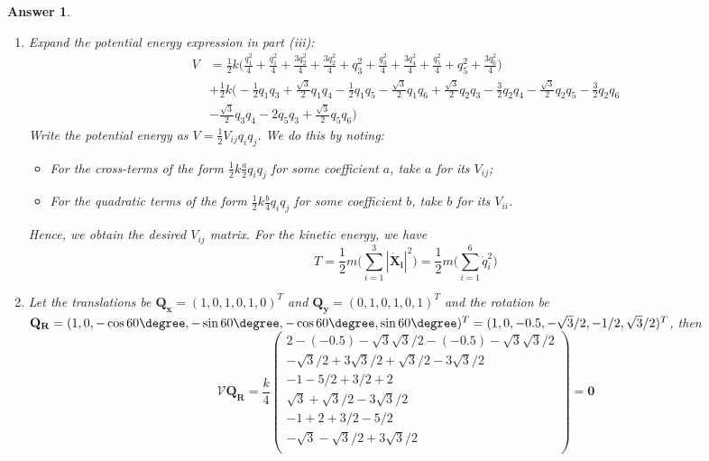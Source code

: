 \documentclass[a4paper]{article}
\newtheorem{ans}{Answer}[section]
\theoremstyle{new}
\begin{document}
\begin{ans}
\begin{enumerate}[label=(\roman*)]
$$\mathbf{x_1}-\mathbf{x_3}=\begin{pmatrix}q_1-q_5\\q_2-q_6\\\end{pmatrix}+\begin{pmatrix}\sqrt{3}/2\\3/2\\\end{pmatrix}\implies V_{1,3}=\frac{1}{2}k\bigg[\frac{(\sqrt{3}/2)(q_1-q_5)+(3/2)(q_2-q_6)}{\sqrt{3}}\bigg]^2$$
The potential energy, expanded to quadratic order, will be a sum of these 3 terms.
\item Expand the potential energy expression in part (iii):
\begin{align}
    V&=\frac{1}{2}k\bigg(\frac{q_1^2}{4}+\frac{q_1^2}{4}+\frac{3q_2^2}{4}+\frac{3q_2^2}{4}+q_3^2+\frac{q_3^2}{4}+\frac{3q_4^2}{4}+\frac{q_5^2}{4}+q_5^2+\frac{3q_6^2}{4}\bigg)\nonumber\\&+\frac{1}{2}k\bigg(-\frac{1}{2}q_1q_3+\frac{\sqrt{3}}{2}q_1q_4-\frac{1}{2}q_1q_5-\frac{\sqrt{3}}{2}q_1q_6+\frac{\sqrt{3}}{2}q_2q_3-\frac{3}{2}q_2q_4-\frac{\sqrt{3}}{2}q_2q_5-\frac{3}{2}q_2q_6\nonumber\\&-\frac{\sqrt{3}}{2}q_3q_4-2q_5q_3+\frac{\sqrt{3}}{2}q_5q_6\bigg)\nonumber
\end{align}
Write the potential energy as $V=\frac{1}{2}V_{ij}q_iq_j$. We do this by noting:
\begin{itemize}
    \item For the cross-terms of the form $\frac{1}{2}k\frac{a}{2}q_iq_j$ for some coefficient $a$, take $a$ for its $V_{ij}$;
    \item For the quadratic terms of the form $\frac{1}{2}k\frac{b}{4}q_iq_j$ for some coefficient $b$, take $b$ for its $V_{ii}$.
\end{itemize}
 Hence, we obtain the desired $V_{ij}$ matrix. For the kinetic energy, we have
 $$T=\frac{1}{2}m\bigg(\sum_{i=1}^3|\mathbf{\dot{X}_i}|^2\bigg)=\frac{1}{2}m\bigg(\sum_{i=1}^6\dot{q}_i^2\bigg)$$
 \item Let the translations be $\mathbf{Q_x}=(1,0,1,0,1,0)^T$ and $\mathbf{Q_y}=(0,1,0,1,0,1)^T$ and the rotation be $\mathbf{Q_R}=(1,0,-\cos60\degree,-\sin60\degree,-\cos60\degree,\sin60\degree)^T=(1,0,-0.5,-\sqrt{3}/2,-1/2,\sqrt{3}/2)^T$, then
 $$\mathcal{V}\mathbf{Q_R}=\frac{k}{4}\begin{pmatrix}2-(-0.5)-\sqrt{3}\sqrt{3}/2-(-0.5)-\sqrt{3}\sqrt{3}/2\\-\sqrt{3}/2+3\sqrt{3}/2+\sqrt{3}/2-3\sqrt{3}/2\\-1-5/2+3/2+2\\\sqrt{3}+\sqrt{3}/2-3\sqrt{3}/2\\-1+2+3/2-5/2\\-\sqrt{3}-\sqrt{3}/2+3\sqrt{3}/2\\\end{pmatrix}=\boldsymbol{0}$$

\end{enumerate}
\end{ans}
\end{document}
